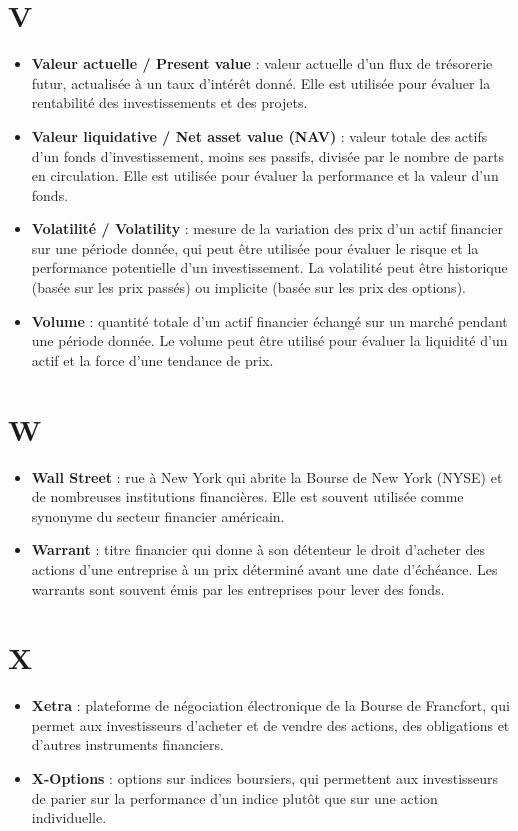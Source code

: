 \documentclass[a4paper,10pt]{article}
\begin{document}
\begin{multicols}{2}
\section*{V}
\begin{itemize}
  \item \textbf{Valeur actuelle / Present value} : valeur actuelle d’un flux de trésorerie futur, actualisée à un taux d’intérêt donné. Elle est utilisée pour évaluer la rentabilité des investissements et des projets.
  \item \textbf{Valeur liquidative / Net asset value (NAV)} : valeur totale des actifs d’un fonds d’investissement, moins ses passifs, divisée par le nombre de parts en circulation. Elle est utilisée pour évaluer la performance et la valeur d’un fonds.
  \item \textbf{Volatilité / Volatility} : mesure de la variation des prix d’un actif financier sur une période donnée, qui peut être utilisée pour évaluer le risque et la performance potentielle d’un investissement. La volatilité peut être historique (basée sur les prix passés) ou implicite (basée sur les prix des options).
  \item \textbf{Volume} : quantité totale d'un actif financier échangé sur un marché pendant une période donnée. Le volume peut être utilisé pour évaluer la liquidité d'un actif et la force d'une tendance de prix.
\end{itemize}

\section*{W}
\begin{itemize}
  \item \textbf{Wall Street} : rue à New York qui abrite la Bourse de New York (NYSE) et de nombreuses institutions financières. Elle est souvent utilisée comme synonyme du secteur financier américain.
  \item \textbf{Warrant} : titre financier qui donne à son détenteur le droit d’acheter des actions d’une entreprise à un prix déterminé avant une date d’échéance. Les warrants sont souvent émis par les entreprises pour lever des fonds.
\end{itemize}

\section*{X}
\begin{itemize}
  \item \textbf{Xetra} : plateforme de négociation électronique de la Bourse de Francfort, qui permet aux investisseurs d’acheter et de vendre des actions, des obligations et d’autres instruments financiers.
  \item \textbf{X-Options} : options sur indices boursiers, qui permettent aux investisseurs de parier sur la performance d’un indice plutôt que sur une action individuelle.
\end{itemize}


\end{multicols}
\end{document}
